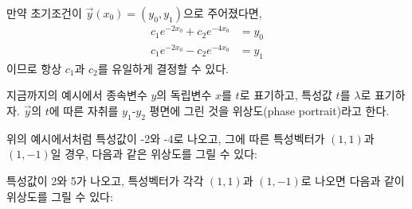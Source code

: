 \documentclass[../engineering_mathematics_lecture_note.tex]{subfiles}
\begin{document}
\begin{example}
    만약 초기조건이 $\vec y(x_0) = (y_0, y_1)$으로 주어졌다면,
    \begin{align*}
        c_1 e^{-2 x_0} + c_2 e^{-4 x_0} &= y_0\\
        c_1 e^{-2 x_0} - c_2 e^{-4 x_0} &= y_1
    \end{align*}
    이므로 항상 $c_1$과 $c_2$를 유일하게 결정할 수 있다.
\end{example}

지금까지의 예시에서 종속변수 $y$의 독립변수 $x$를 $t$로 표기하고, 특성값 $t$를 $\lambda$로 표기하자.
$\vec y$의 $t$에 따른 자취를 $y_1$-$y_2$ 평면에 그린 것을 위상도(phase portrait)라고 한다.

위의 예시에서처럼 특성값이 -2와 -4로 나오고, 그에 따른 특성벡터가 $(1, 1)$과 $(1, -1)$일 경우, 다음과 같은 위상도를 그릴 수 있다:

특성값이 2와 5가 나오고, 특성벡터가 각각 $(1, 1)$과 $(1, -1)$로 나오면 다음과 같이 위상도를 그릴 수 있다:
\end{document}
